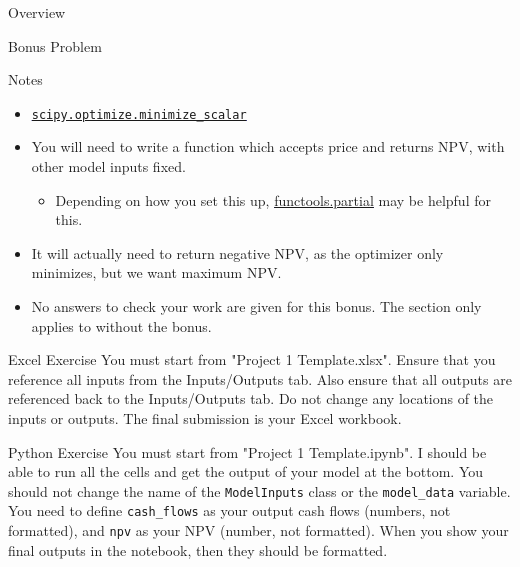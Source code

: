 \documentclass[]{article}
\begin{document}
\begin{section}{Overview}
\begin{subsection}{Bonus Problem}
\begin{subsubsection}{Notes}
\begin{itemize}
\begin{itemize}
\item \textcolor{blue}{\underline{\href{https://docs.scipy.org/doc/scipy/reference/generated/scipy.optimize.minimize\_scalar.html\#scipy-optimize-minimize-scalar}{\texttt{scipy.optimize.minimize\_scalar}}}}
\item You will need to write a function which accepts price and returns NPV, with other model inputs fixed.
\begin{itemize}
\item Depending on how you set this up,
\textcolor{blue}{\underline{\href{https://www.learnpython.org/en/Partial\_functions}{functools.partial}}}
may be helpful for this.
\end{itemize}
\item It will actually need to return negative NPV, as the optimizer only minimizes, but we want maximum NPV.
\item No answers to check your work are given for this bonus. The
section only applies to without the bonus.
\end{itemize}
\end{itemize}
\end{subsubsection}
\end{subsection}
\end{section}
\begin{section}{Excel Exercise}
You must start from "Project 1 Template.xlsx". Ensure that you reference all inputs from the Inputs/Outputs tab. Also ensure that all outputs are referenced back to the Inputs/Outputs tab. Do not change any locations of the inputs or outputs. The final submission is your Excel workbook.
\end{section}
\begin{section}{Python Exercise}
You must start from "Project 1 Template.ipynb". I should be able to run all the cells and get the output of your model at the bottom. 
You should not change the name of the
\texttt{ModelInputs}
class or the
\texttt{model\_data}
variable.
You need to define
\texttt{cash\_flows}
as your output cash flows (numbers, not formatted), and 
\texttt{npv}
as your NPV (number, not formatted). When you show your final outputs in the notebook, then they should be formatted.
\end{section}
\end{document}
